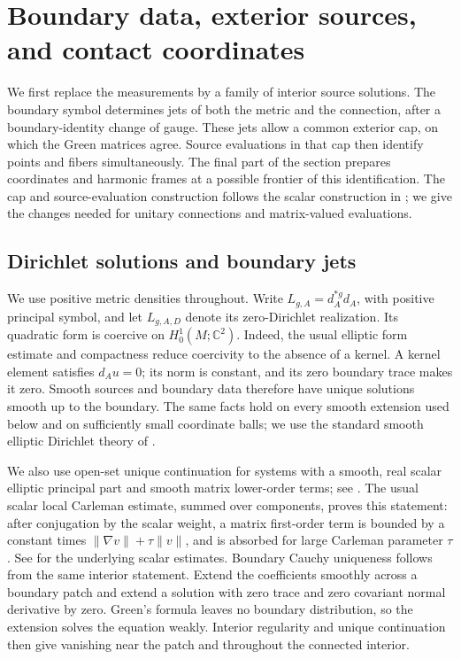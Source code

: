 \section{Boundary data, exterior sources, and contact coordinates}
\label{bdy:section}\label{sec:boundary}

We first replace the measurements by a family of interior source
solutions.  The boundary symbol determines jets of both the metric and
the connection, after a boundary-identity change of gauge.  These jets
allow a common exterior cap, on which the Green matrices agree.  Source
evaluations in that cap then identify points and fibers simultaneously.
The final part of the section prepares coordinates and harmonic frames
at a possible frontier of this identification.  The cap and
source-evaluation construction follows the scalar construction in
\cite[Section~2]{ScalarCompanion2026}; we give the changes needed for
unitary connections and matrix-valued evaluations.

\subsection{Dirichlet solutions and boundary jets}

We use positive metric densities throughout.  Write
\(L_{g,A}=d_A^{*g}d_A\), with positive principal symbol, and let
\(L_{g,A,D}\) denote its zero-Dirichlet realization.  Its quadratic form
is coercive on \(H^1_0(M;\mathbb C^2)\).  Indeed, the usual elliptic form
estimate and compactness reduce coercivity to the absence of a kernel.
A kernel element satisfies \(d_Au=0\); its norm is constant, and its
zero boundary trace makes it zero.  Smooth sources and boundary data
therefore have unique solutions smooth up to the boundary.  The same
facts hold on every smooth extension used below and on sufficiently
small coordinate balls; we use the standard smooth elliptic Dirichlet
theory of \cite[Chapter~5]{TaylorPDEI2011}.

We also use open-set unique continuation for systems with a smooth,
real scalar elliptic principal part and smooth matrix lower-order
terms; see \cite[Remark~3]{Aronszajn1957}.  The usual scalar local
Carleman estimate, summed over components, proves this statement: after conjugation by the scalar
weight, a matrix first-order term is bounded by a constant times
\(\|\nabla v\|+\tau\|v\|\), and is absorbed for large Carleman
parameter \(\tau\).  See \cite[Chapter~XXVIII]{HormanderIV2009} for the
underlying scalar estimates.  Boundary Cauchy uniqueness follows from
the same interior statement.  Extend the coefficients smoothly across
a boundary patch and extend a solution with zero trace and zero
covariant normal derivative by zero.  Green's formula leaves no
boundary distribution, so the extension solves the equation
weakly.  Interior regularity and unique continuation then give
vanishing near the patch and throughout the connected interior.

